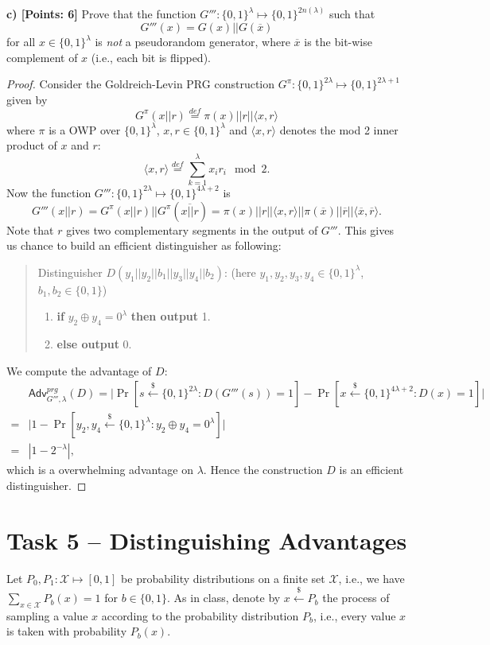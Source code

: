 \documentclass[12pt]{article}
\newcommand{\eqdef}{\stackrel{def}{=}}
\newcommand{\bits}{\{0,1\}}
\newcommand{\getsr}{\stackrel{\$}{\gets}}
\newcommand{\angles}[1]{\langle #1 \rangle}
\newcommand{\Adv}{\textsf{Adv}}
\theoremstyle{definition}
\begin{document}
{\bf c) [Points: 6]} Prove that the function $G''' : \bits^{\lambda} \mapsto \bits^{2n(\lambda)}$ such that
$$G'''(x) = G(x)||G(\overline{x})$$
for all $x\in\bits^\lambda$ is \emph{not} a pseudorandom generator, where $\overline{x}$ is the bit-wise complement of $x$ (i.e., each bit is flipped).
\begin{proof}
Consider the Goldreich-Levin PRG construction $G^\pi : \bits^{2\lambda} \mapsto \bits^{2\lambda+1}$ given by
$$G^\pi(x||r) \eqdef \pi(x)||r||\angles{x,r}$$
where $\pi$ is a OWP over $\bits^\lambda$, $x,r \in \bits^\lambda$ and $\angles{x,r}$ denotes the mod 2 inner product of $x$ and $r$:
$$\angles{x,r} \eqdef \sum_{k=1}^\lambda x_ir_i\mod 2.$$
Now the function $G''' : \bits^{2\lambda} \mapsto \bits^{4\lambda+2}$ is
$$G'''(x||r) = G^\pi(x||r)||G^\pi(\overline{x||r}) = \pi(x)||r||\angles{x,r}||\pi(\overline{x})||\overline{r}||\angles{\overline{x},\overline{r}}.$$
Note that $r$ gives two complementary segments in the output of $G'''$. This gives us chance to build an efficient distinguisher as following:
\begin{quote}
Distinguisher $D(y_1||y_2||b_1||y_3||y_4||b_2)$: (here $y_1,y_2,y_3,y_4 \in \bits^\lambda$, $b_1,b_2\in\bits$)
\begin{enumerate}
\item {\bf if} $y_2 \oplus y_4 = 0^\lambda$ {\bf then output} 1.
\item {\bf else output} 0.
\end{enumerate}
\end{quote}
We compute the advantage of $D$:
$$
\begin{aligned}
&\Adv_{G''',\lambda}^{prg}(D) = \bigg| \Pr[s\getsr \bits^{2\lambda}: D(G'''(s))=1] - \Pr[x\getsr \bits^{4\lambda+2}: D(x)=1] \bigg| \\
=& \bigg| 1 - \Pr[y_2,y_4 \getsr\bits^\lambda: y_2 \oplus y_4 = 0^\lambda] \bigg| \\
=& | 1 - 2^{-\lambda} |,
\end{aligned}
$$
which is a overwhelming advantage on $\lambda$. Hence the construction $D$ is an efficient distinguisher.
\end{proof}


\section{Task 5 – Distinguishing Advantages}
Let $P_0, P_1 : \mathcal{X} \mapsto [0,1]$ be probability distributions on a finite set $\mathcal{X}$, i.e., we have $\sum_{x\in\mathcal{X}}P_b(x) = 1$ for $b\in\bits$. As in class, denote by $x\getsr P_b$ the process of sampling a value $x$ according to the probability distribution $P_b$, i.e., every value $x$ is taken with probability $P_b(x)$.
\end{document}
